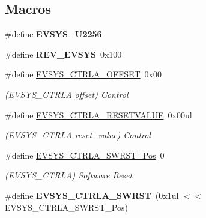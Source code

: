 \subsection*{Macros}
\begin{DoxyCompactItemize}
\item 
\hypertarget{group___s_a_m_l21___e_v_s_y_s_gaf03c16850ff13d684441ca42a05e0fb4}{}\#define {\bfseries E\+V\+S\+Y\+S\+\_\+\+U2256}\label{group___s_a_m_l21___e_v_s_y_s_gaf03c16850ff13d684441ca42a05e0fb4}

\item 
\hypertarget{group___s_a_m_l21___e_v_s_y_s_ga973936e91b4175039038db84c581d977}{}\#define {\bfseries R\+E\+V\+\_\+\+E\+V\+S\+Y\+S}~0x100\label{group___s_a_m_l21___e_v_s_y_s_ga973936e91b4175039038db84c581d977}

\item 
\hypertarget{group___s_a_m_l21___e_v_s_y_s_ga9c19dd4f0e5049313e765d9b91338912}{}\#define \hyperlink{group___s_a_m_l21___e_v_s_y_s_ga9c19dd4f0e5049313e765d9b91338912}{E\+V\+S\+Y\+S\+\_\+\+C\+T\+R\+L\+A\+\_\+\+O\+F\+F\+S\+E\+T}~0x00\label{group___s_a_m_l21___e_v_s_y_s_ga9c19dd4f0e5049313e765d9b91338912}

\begin{DoxyCompactList}\small\item\em (E\+V\+S\+Y\+S\+\_\+\+C\+T\+R\+L\+A offset) Control \end{DoxyCompactList}\item 
\hypertarget{group___s_a_m_l21___e_v_s_y_s_ga62b57b85c568e42ba4488825a6297985}{}\#define \hyperlink{group___s_a_m_l21___e_v_s_y_s_ga62b57b85c568e42ba4488825a6297985}{E\+V\+S\+Y\+S\+\_\+\+C\+T\+R\+L\+A\+\_\+\+R\+E\+S\+E\+T\+V\+A\+L\+U\+E}~0x00ul\label{group___s_a_m_l21___e_v_s_y_s_ga62b57b85c568e42ba4488825a6297985}

\begin{DoxyCompactList}\small\item\em (E\+V\+S\+Y\+S\+\_\+\+C\+T\+R\+L\+A reset\+\_\+value) Control \end{DoxyCompactList}\item 
\hypertarget{group___s_a_m_l21___e_v_s_y_s_ga4d17eb23599371688a7499a86755f6fd}{}\#define \hyperlink{group___s_a_m_l21___e_v_s_y_s_ga4d17eb23599371688a7499a86755f6fd}{E\+V\+S\+Y\+S\+\_\+\+C\+T\+R\+L\+A\+\_\+\+S\+W\+R\+S\+T\+\_\+\+Pos}~0\label{group___s_a_m_l21___e_v_s_y_s_ga4d17eb23599371688a7499a86755f6fd}

\begin{DoxyCompactList}\small\item\em (E\+V\+S\+Y\+S\+\_\+\+C\+T\+R\+L\+A) Software Reset \end{DoxyCompactList}\item 
\hypertarget{group___s_a_m_l21___e_v_s_y_s_ga302b91af632ae90b2d0d4afcd84e648f}{}\#define {\bfseries E\+V\+S\+Y\+S\+\_\+\+C\+T\+R\+L\+A\+\_\+\+S\+W\+R\+S\+T}~(0x1ul $<$$<$ E\+V\+S\+Y\+S\+\_\+\+C\+T\+R\+L\+A\+\_\+\+S\+W\+R\+S\+T\+\_\+\+Pos)\label{group___s_a_m_l21___e_v_s_y_s_ga302b91af632ae90b2d0d4afcd84e648f}


\end{DoxyCompactItemize}

